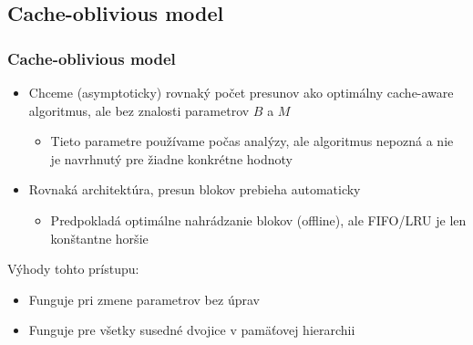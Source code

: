 \documentclass{beamer}
\begin{document}
\subsection{Cache-oblivious model}
\begin{frame}
	\frametitle{Cache-oblivious model}%
	\begin{itemize}
		\item Chceme (asymptoticky) rovnaký počet presunov ako optimálny cache-aware algoritmus, ale bez znalosti parametrov $B$ a $M$
		\begin{itemize}
		    \item Tieto parametre používame počas analýzy, ale algoritmus nepozná a nie je navrhnutý pre žiadne konkrétne hodnoty
		\end{itemize}
		\item Rovnaká architektúra, presun blokov prebieha automaticky
		\begin{itemize}
			\item Predpokladá optimálne nahrádzanie blokov (offline), ale FIFO/LRU je len konštantne horšie
		\end{itemize}
	\end{itemize}
	Výhody tohto prístupu:
	\begin{itemize}
	    \item Funguje pri zmene parametrov bez úprav
	    \item Funguje pre všetky susedné dvojice v pamäťovej hierarchii
	\end{itemize}
\end{frame}
\end{document}
